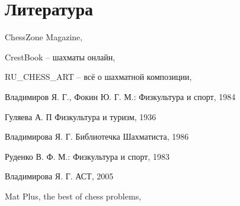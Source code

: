\section*{Литература}
\begin{thebibliography}{9}

  ChessZone Magazine, 

  CrestBook -- шахматы онлайн, 

  RU\_CHESS\_ART -- всё о шахматной композиции,

  Владимиров Я. Г., Фокин Ю. Г. 
  М.: Физкультура и спорт, 1984
    
  Гуляева А. П 
  Физкультура и туризм, 1936

  Владимирова Я. Г. 
  Библиотечка Шахматиста, 1986
  
  Руденко В. Ф. 
  М.: Физкультура и спорт, 1983

  Владимирова Я. Г. 
  АСТ, 2005

  Mat Plus, the best of chess problems,
\end{thebibliography}